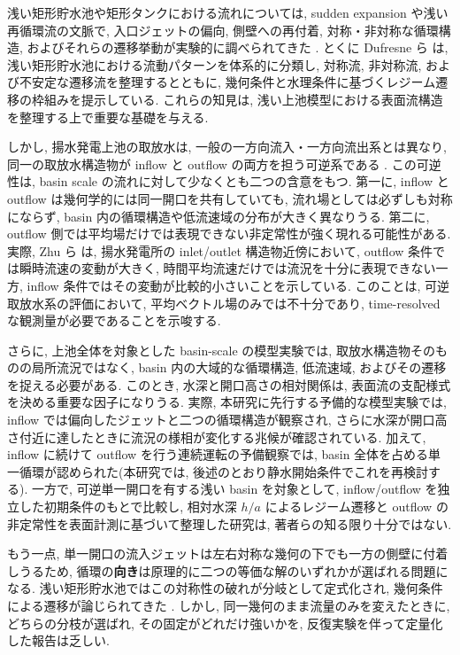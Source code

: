 浅い矩形貯水池や矩形タンクにおける流れについては, sudden expansion や浅い再循環流の文脈で, 入口ジェットの偏向, 側壁への再付着, 対称・非対称な循環構造, およびそれらの遷移挙動が実験的に調べられてきた \cite{babarutsiExperimentalInvestigationShallow1989,mullinFlowSymmetricChannel2003,dewalsExperimentalNumericalAnalysis2008}. とくに Dufresne ら \cite{dufresneClassificationFlowPatterns2010} は, 浅い矩形貯水池における流動パターンを体系的に分類し, 対称流, 非対称流, および不安定な遷移流を整理するとともに, 幾何条件と水理条件に基づくレジーム遷移の枠組みを提示している. これらの知見は, 浅い上池模型における表面流構造を整理する上で重要な基礎を与える.

しかし, 揚水発電上池の取放水は, 一般の一方向流入・一方向流出系とは異なり, 同一の取放水構造物が inflow と outflow の両方を担う可逆系である \cite{zhangParameterAnalysisPerformance2020,bermudezHydraulicModelStudy2017}. この可逆性は, basin scale の流れに対して少なくとも二つの含意をもつ. 第一に, inflow と outflow は幾何学的には同一開口を共有していても, 流れ場としては必ずしも対称にならず, basin 内の循環構造や低流速域の分布が大きく異なりうる. 第二に, outflow 側では平均場だけでは表現できない非定常性が強く現れる可能性がある. 実際, Zhu ら \cite{zhuExperimentalInvestigationUnsteady2023} は, 揚水発電所の inlet/outlet 構造物近傍において, outflow 条件では瞬時流速の変動が大きく, 時間平均流速だけでは流況を十分に表現できない一方, inflow 条件ではその変動が比較的小さいことを示している. このことは, 可逆取放水系の評価において, 平均ベクトル場のみでは不十分であり, time-resolved な観測量が必要であることを示唆する.

さらに, 上池全体を対象とした basin-scale の模型実験では, 取放水構造物そのものの局所流況ではなく, basin 内の大域的な循環構造, 低流速域, およびその遷移を捉える必要がある. このとき, 水深と開口高さの相対関係は, 表面流の支配様式を決める重要な因子になりうる. 実際, 本研究に先行する予備的な模型実験では, inflow では偏向したジェットと二つの循環構造が観察され, さらに水深が開口高さ付近に達したときに流況の様相が変化する兆候が確認されている. 加えて, inflow に続けて outflow を行う連続運転の予備観察では, basin 全体を占める単一循環が認められた(本研究では, 後述のとおり静水開始条件でこれを再検討する). 一方で, 可逆単一開口を有する浅い basin を対象として, inflow/outflow を独立した初期条件のもとで比較し, 相対水深 $h/a$ によるレジーム遷移と outflow の非定常性を表面計測に基づいて整理した研究は, 著者らの知る限り十分ではない.

もう一点, 単一開口の流入ジェットは左右対称な幾何の下でも一方の側壁に付着しうるため, 循環の\textbf{向き}は原理的に二つの等価な解のいずれかが選ばれる問題になる. 浅い矩形貯水池ではこの対称性の破れが分岐として定式化され, 幾何条件による遷移が論じられてきた \cite{dewalsExperimentalNumericalAnalysis2008,mullinFlowSymmetricChannel2003}. しかし, 同一幾何のまま流量のみを変えたときに, どちらの分枝が選ばれ, その固定がどれだけ強いかを, 反復実験を伴って定量化した報告は乏しい.

